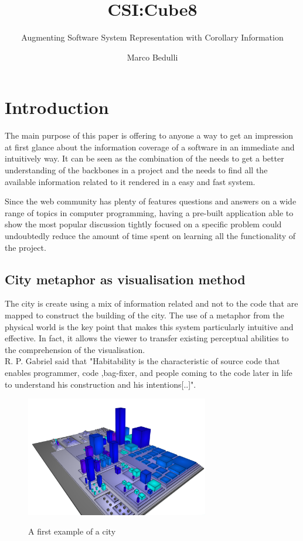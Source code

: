 \documentclass[]{usiinfbachelorproject}
\author{Marco Bedulli}
\title{CSI:Cube8}
\subtitle{Augmenting Software System Representation with Corollary Information}
\begin{document}
\maketitle

\tableofcontents 


\pagebreak
\listoffigures

\pagebreak

\section{Introduction} \label{introduction}

The main purpose of this paper is offering to anyone a way to get an impression at first glance about the information coverage of a software in an immediate and intuitively way. It can be seen as the combination of the needs to get a better understanding of the backbones in a project and the needs to find all the available information related to it rendered in a easy and fast system.

Since the web community has plenty of features questions and answers on a wide range of topics in computer programming, having a pre-built application able to show the most popular discussion tightly focused on a specific problem could undoubtedly reduce the amount of time spent on learning all the functionality of the project.



\subsection{City metaphor as visualisation method } 


The city is create using a mix of information related and not to the code that are mapped to construct the building of the city.
The use of a metaphor from the physical world is the key point that makes this system particularly intuitive and effective. In fact, it allows the viewer to transfer existing perceptual abilities to the comprehension of the visualisation.\\
R. P. Gabriel \cite{gabry} said that "Habitability is the characteristic of source code that enables programmer, code ,bag-fixer, and people coming to the code later in life to understand his construction and his intentions[..]". 
\begin{figure}[h]
	\centering
\includegraphics[width=8cm]{images/city1}
\label {myO}
\caption{A first example of a city}
\end{figure}
\end{document}
